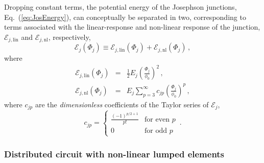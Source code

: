 Dropping constant terms, the potential energy of the Josephson junctions,
Eq.~(\ref{eq:JosEnergy}), can conceptually be separated in two,
corresponding to terms associated with the linear-response and non-linear
response of the junction, $\mathcal{E}_{j\mathrm{,lin}}$ and $\mathcal{E}_{j\mathrm{,nl}}$,
respectively, 
\begin{equation}
\mathcal{E}_{j}\left(\Phi_{j}\right)\equiv\mathcal{E}_{j\mathrm{,lin}}\left(\Phi_{j}\right)+\mathcal{E}_{j\mathrm{,nl}}\left(\Phi_{j}\right)\,,\label{eq:app:circuit: defn of junc energy}
\end{equation}
where \begin{subequations} \label{eq:app:circuit: defn of junc}
\begin{eqnarray}
\mathcal{E}_{j\mathrm{,lin}}\left(\Phi_{j}\right) & = & \frac{1}{2}E_{j}\left(\frac{\Phi_{j}}{\phi_{0}}\right)^{2}\,,\label{eq:app:circuit: defn oof Uj lin}\\
\mathcal{E}_{j\mathrm{,nl}}\left(\Phi_{j}\right) & = & E_{j}\sum_{p=3}^{\infty}c_{jp}\left(\frac{\Phi_{j}}{\phi_{0}}\right)^{p}\,,\label{eq:app:circuit: defn oof Uj nl}
\end{eqnarray}
\end{subequations} where $c_{jp}$ are the \textit{dimensionless}
coefficients of the Taylor series of $\mathcal{E}_{j}$,
\begin{equation}
c_{jp}=\begin{cases}
\frac{\left(-1\right)^{p/2+1}}{p!} & \text{for even }p\\
0 & \text{for odd }p
\end{cases}\,.\label{eq:app:Jos potentual Ujn}
\end{equation}


\subsubsection{Distributed circuit with non-linear lumped elements }

